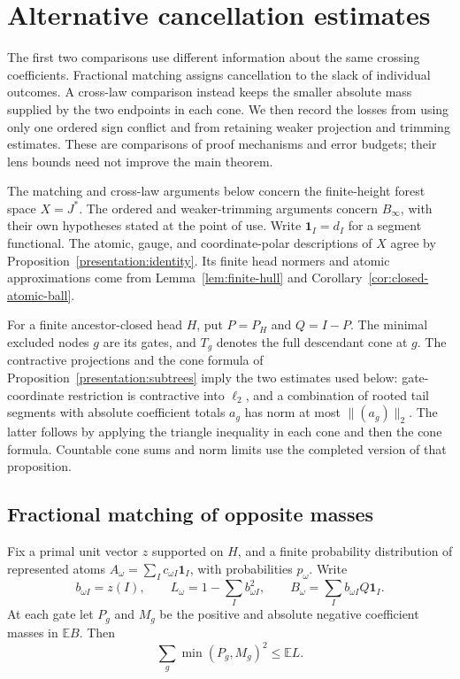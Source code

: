 \section{Alternative cancellation estimates}
\label{molb:sec:variants}

The first two comparisons use different information about the same
crossing coefficients. Fractional matching assigns cancellation to the
slack of individual outcomes. A cross-law comparison instead keeps the
smaller absolute mass supplied by the two endpoints in each cone.
We then record the losses from using only one ordered sign conflict
and from retaining weaker projection and trimming estimates.
These are comparisons of proof mechanisms and error budgets; their
lens bounds need not improve the main theorem.

The matching and cross-law arguments below concern the finite-height
forest space $X=J^*$. The ordered and weaker-trimming arguments concern
$B_\infty$, with their own hypotheses stated at the point of use.
Write $\mathbf1_I=d_I$ for a segment functional. The atomic, gauge,
and coordinate-polar descriptions of $X$ agree by
Proposition~\ref{presentation:identity}. Its finite head normers and
atomic approximations come from Lemma~\ref{lem:finite-hull} and
Corollary~\ref{cor:closed-atomic-ball}.

For a finite ancestor-closed head \(H\), put \(P=P_H\) and \(Q=I-P\).
The minimal excluded nodes \(g\) are its gates, and \(T_g\) denotes the
full descendant cone at \(g\).  The contractive projections and the
cone formula of Proposition~\ref{presentation:subtrees} imply the two
estimates used below: gate-coordinate restriction is contractive into
\(\ell_2\), and a combination of rooted tail segments with absolute
coefficient totals \(a_g\) has norm at most \(\|(a_g)\|_2\).
The latter follows by applying the triangle inequality in each cone
and then the cone formula.  Countable cone sums and norm limits use
the completed version of that proposition.

\subsection{Fractional matching of opposite masses}
\label{molb:sec:matching}

\begin{lemma}\label{molb:lem:matching}
Fix a primal unit vector \(z\) supported on \(H\), and a finite
probability distribution of represented atoms
\(A_\omega=\sum_Ic_{\omega I}\mathbf1_I\), with probabilities
\(p_\omega\).  Write
\[
 b_{\omega I}=z(I),\qquad
 L_\omega=1-\sum_Ib_{\omega I}^2,\qquad
 B_\omega=\sum_Ib_{\omega I}Q\mathbf1_I.
\]
At each gate let \(P_g\) and \(M_g\) be the positive and absolute
negative coefficient masses in \(\mathbb E B\).  Then
\begin{equation}\label{molb:eq:matching-capacity}
 \sum_g\min(P_g,M_g)^2\le\mathbb E L.
\end{equation}
\end{lemma}

